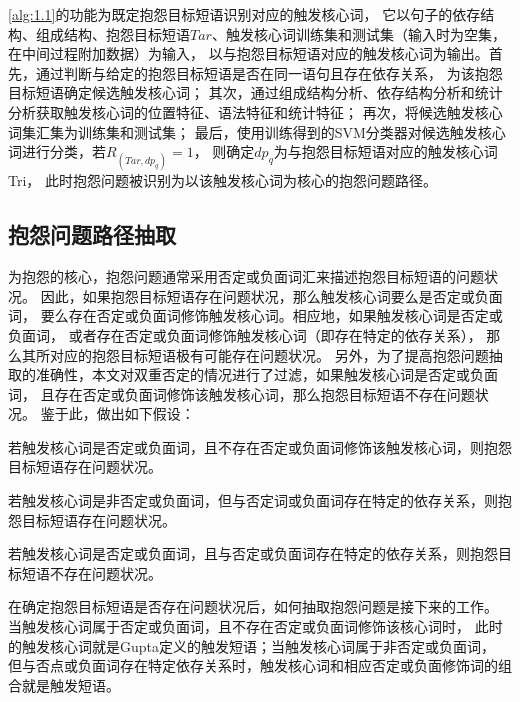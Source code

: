 \autoref{alg:1.1}的功能为既定抱怨目标短语识别对应的触发核心词，
它以句子的依存结构、组成结构、抱怨目标短语$Tar$、触发核心词训练集和测试集（输入时为空集，在中间过程附加数据）为输入，
以与抱怨目标短语对应的触发核心词为输出。首先，通过判断与给定的抱怨目标短语是否在同一语句且存在依存关系，
为该抱怨目标短语确定候选触发核心词；
其次，通过组成结构分析、依存结构分析和统计分析获取触发核心词的位置特征、语法特征和统计特征；
再次，将候选触发核心词集汇集为训练集和测试集；
最后，使用训练得到的SVM分类器对候选触发核心词进行分类，若$R_{(Tar,dp_q)}=1$，
则确定$dp_q$为与抱怨目标短语对应的触发核心词Tri，
此时抱怨问题被识别为以该触发核心词为核心的抱怨问题路径。

\subsection{抱怨问题路径抽取}\label{subsection:1.3.4}

为抱怨的核心，抱怨问题通常采用否定或负面词汇来描述抱怨目标短语的问题状况。
因此，如果抱怨目标短语存在问题状况，那么触发核心词要么是否定或负面词，
要么存在否定或负面词修饰触发核心词。相应地，如果触发核心词是否定或负面词，
或者存在否定或负面词修饰触发核心词（即存在特定的依存关系），
那么其所对应的抱怨目标短语极有可能存在问题状况。
另外，为了提高抱怨问题抽取的准确性，本文对双重否定的情况进行了过滤，如果触发核心词是否定或负面词，
且存在否定或负面词修饰该触发核心词，那么抱怨目标短语不存在问题状况。
鉴于此，做出如下假设：
\begin{assumption}\label{assumption:1.3}
    若触发核心词是否定或负面词，且不存在否定或负面词修饰该触发核心词，则抱怨目标短语存在问题状况。
\end{assumption}

\begin{assumption}\label{assumption:1.4}
    若触发核心词是非否定或负面词，但与否定词或负面词存在特定的依存关系，则抱怨目标短语存在问题状况。
\end{assumption}

\begin{assumption}\label{assumption:1.5}
    若触发核心词是否定或负面词，且与否定或负面词存在特定的依存关系，则抱怨目标短语不存在问题状况。
\end{assumption}

在确定抱怨目标短语是否存在问题状况后，如何抽取抱怨问题是接下来的工作。
当触发核心词属于否定或负面词，且不存在否定或负面词修饰该核心词时，
此时的触发核心词就是Gupta\cite{gupta2011extracting}定义的触发短语；当触发核心词属于非否定或负面词，
但与否点或负面词存在特定依存关系时，触发核心词和相应否定或负面修饰词的组合就是触发短语。

